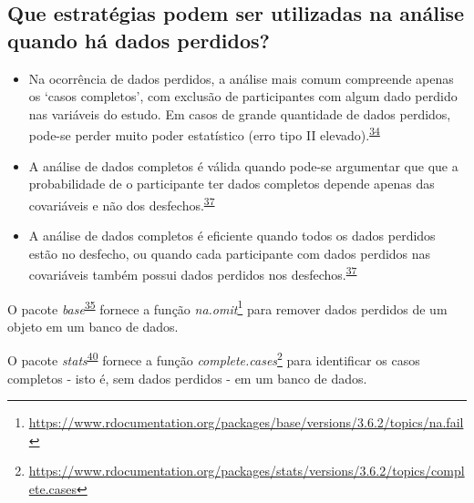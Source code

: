 \documentclass[
  a4paper,
]{book}
\renewcommand{\href}[2]{#2\footnote{\url{#1}}}
\newenvironment{infobox}[1]
  {
  \begin{itemize}
  \renewcommand{\labelitemi}{
    \raisebox{-.7\height}[0pt][0pt]{
      {\setkeys{Gin}{width=3em,keepaspectratio}
        \texttt{[image: \#1]}}
    }
  }
  \setlength{\fboxsep}{1em}
  \begin{blackbox}
  \item
  }
  {
  \end{blackbox}
  \end{itemize}
  }
\begin{document}
\hypertarget{que-estratuxe9gias-podem-ser-utilizadas-na-anuxe1lise-quando-huxe1-dados-perdidos}{%
\subsection{Que estratégias podem ser utilizadas na análise quando há dados perdidos?}\label{que-estratuxe9gias-podem-ser-utilizadas-na-anuxe1lise-quando-huxe1-dados-perdidos}}

\begin{itemize}
\item
  Na ocorrência de dados perdidos, a análise mais comum compreende apenas os `casos completos', com exclusão de participantes com algum dado perdido nas variáveis do estudo. Em casos de grande quantidade de dados perdidos, pode-se perder muito poder estatístico (erro tipo II elevado).\textsuperscript{\protect\hyperlink{ref-Altman2007}{34}}
\item
  A análise de dados completos é válida quando pode-se argumentar que que a probabilidade de o participante ter dados completos depende apenas das covariáveis e não dos desfechos.\textsuperscript{\protect\hyperlink{ref-carpenter2021}{37}}
\item
  A análise de dados completos é eficiente quando todos os dados perdidos estão no desfecho, ou quando cada participante com dados perdidos nas covariáveis também possui dados perdidos nos desfechos.\textsuperscript{\protect\hyperlink{ref-carpenter2021}{37}}
\end{itemize}

\begin{infobox}{images/Rlogo}
O pacote \emph{base}\textsuperscript{\protect\hyperlink{ref-base-2}{35}} fornece a função \href{https://www.rdocumentation.org/packages/base/versions/3.6.2/topics/na.fail}{\emph{na.omit}} para remover dados perdidos de um objeto em um banco de dados.

\end{infobox}

\begin{infobox}{images/Rlogo}
O pacote \emph{stats}\textsuperscript{\protect\hyperlink{ref-stats}{40}} fornece a função \href{https://www.rdocumentation.org/packages/stats/versions/3.6.2/topics/complete.cases}{\emph{complete.cases}} para identificar os casos completos - isto é, sem dados perdidos - em um banco de dados.

\end{infobox}
\end{document}
